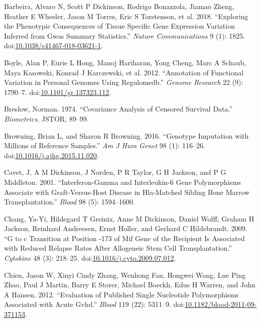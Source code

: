 \documentclass[]{DissertateOSU}
\begin{document}
\hypertarget{ref-Barbeira_2018}{}
Barbeira, Alvaro N, Scott P Dickinson, Rodrigo Bonazzola, Jiamao Zheng,
Heather E Wheeler, Jason M Torres, Eric S Torstenson, et al. 2018.
``Exploring the Phenotypic Consequences of Tissue Specific Gene
Expression Variation Inferred from Gwas Summary Statistics.''
\emph{Nature Communications} 9 (1): 1825.
doi:\href{https://doi.org/10.1038/s41467-018-03621-1}{10.1038/s41467-018-03621-1}.

\hypertarget{ref-Boyle_2012}{}
Boyle, Alan P, Eurie L Hong, Manoj Hariharan, Yong Cheng, Marc A Schaub,
Maya Kasowski, Konrad J Karczewski, et al. 2012. ``Annotation of
Functional Variation in Personal Genomes Using Regulomedb.''
\emph{Genome Research} 22 (9): 1790--7.
doi:\href{https://doi.org/10.1101/gr.137323.112}{10.1101/gr.137323.112}.

\hypertarget{ref-breslow1974}{}
Breslow, Norman. 1974. ``Covariance Analysis of Censored Survival
Data.'' \emph{Biometrics}. JSTOR, 89--99.

\hypertarget{ref-browning_2016}{}
Browning, Brian L, and Sharon R Browning. 2016. ``Genotype Imputation
with Millions of Reference Samples.'' \emph{Am J Hum Genet} 98 (1):
116--26.
doi:\href{https://doi.org/10.1016/j.ajhg.2015.11.020}{10.1016/j.ajhg.2015.11.020}.

\hypertarget{ref-cavet_2001}{}
Cavet, J, A M Dickinson, J Norden, P R Taylor, G H Jackson, and P G
Middleton. 2001. ``Interferon-Gamma and Interleukin-6 Gene Polymorphisms
Associate with Graft-Versus-Host Disease in Hla-Matched Sibling Bone
Marrow Transplantation.'' \emph{Blood} 98 (5): 1594--1600.

\hypertarget{ref-chang_2009}{}
Chang, Ya-Yi, Hildegard T Greinix, Anne M Dickinson, Daniel Wolff,
Graham H Jackson, Reinhard Andreesen, Ernst Holler, and Gerhard C
Hildebrandt. 2009. ``G to c Transition at Position -173 of Mif Gene of
the Recipient Is Associated with Reduced Relapse Rates After Allogeneic
Stem Cell Transplantation.'' \emph{Cytokine} 48 (3): 218--25.
doi:\href{https://doi.org/10.1016/j.cyto.2009.07.012}{10.1016/j.cyto.2009.07.012}.

\hypertarget{ref-chien_2012}{}
Chien, Jason W, Xinyi Cindy Zhang, Wenhong Fan, Hongwei Wang, Lue Ping
Zhao, Paul J Martin, Barry E Storer, Michael Boeckh, Edus H Warren, and
John A Hansen. 2012. ``Evaluation of Published Single Nucleotide
Polymorphisms Associated with Acute Gvhd.'' \emph{Blood} 119 (22):
5311--9.
doi:\href{https://doi.org/10.1182/blood-2011-09-371153}{10.1182/blood-2011-09-371153}.
\end{document}
